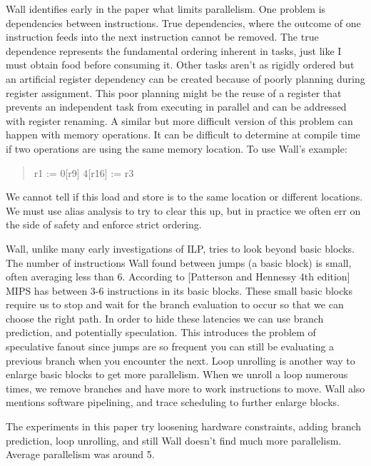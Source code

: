\documentclass[12pt,twoside,letterpaper]{article}
\begin{document}
Wall identifies early in the paper what limits parallelism. One problem is dependencies between instructions. True dependencies, where the outcome of one instruction feeds into the next instruction cannot be removed. The true dependence represents the fundamental ordering inherent in tasks, just like I must obtain food before consuming it. Other tasks aren't as rigidly ordered but an artificial register dependency can be created because of poorly planning during register assignment. This poor planning might be the reuse of a register that prevents an independent task from executing in parallel and can be addressed with register renaming. A similar but more difficult version of this problem can happen with memory operations. It can be difficult to determine at compile time if two operations are using the same memory location. To use Wall’s example:

\begin{quote}
r1 := 0[r9]
4[r16] := r3
\end{quote}

We cannot tell if this load and store is to the same location or different locations. We must use alias analysis to try to clear this up, but in practice we often err on the side of safety and enforce strict ordering.

Wall, unlike many early investigations of ILP, tries to look beyond basic blocks. The number of instructions Wall found between jumps (a basic block) is small, often averaging less than 6. According to [Patterson and Hennessy 4th edition] MIPS has between 3-6 instructions in its basic blocks. These small basic blocks require us to stop and wait for the branch evaluation to occur so that we can choose the right path. In order to hide these latencies we can use branch prediction, and potentially speculation. This introduces the problem of speculative fanout since jumps are so frequent you can still be evaluating a previous branch when you encounter the next. Loop unrolling is another way to enlarge basic blocks to get more parallelism. When we unroll a loop numerous times, we remove branches and have more to work instructions to move. Wall also mentions software pipelining, and trace scheduling to further enlarge blocks.

The experiments in this paper try loosening hardware constraints, adding branch prediction, loop unrolling, and still Wall doesn’t find much more parallelism. Average parallelism was around 5.
\end{document}
